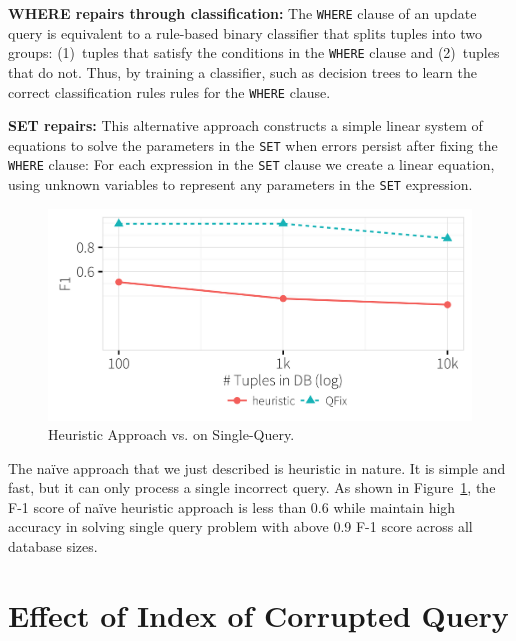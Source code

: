 \noindent
\textbf{WHERE repairs through classification:}
The \texttt{WHERE} clause of an update query is equivalent to a
rule-based binary classifier that splits tuples into two groups:
(1)~tuples that satisfy the conditions in the \texttt{WHERE} clause
and (2)~tuples that do not. Thus, by training a classifier,
such as decision trees \cite{quinlan1987} to learn
the correct classification rules rules for the \texttt{WHERE} clause.

\noindent
\textbf{SET repairs:}
This alternative approach constructs 
a simple linear system of equations to solve the parameters in the \texttt{SET}
when errors persist after fixing the \texttt{WHERE} clause:
For each expression in the \texttt{SET} clause we create a
linear equation, using unknown variables to represent any parameters
in the \texttt{SET} expression. 
  \begin{figure}[h]
  \centering
    \includegraphics[width = .6\columnwidth]{figures/heuristicacc}
    \vspace*{-.1in}
    \caption{Heuristic Approach vs. \sys on Single-Query. }
    \label{f:heuristic_acc} 
  \end{figure}
  \vspace*{-0.1in}
  
The na\"ive approach that we just described is heuristic in nature. It
is simple and fast, but it can only process a single incorrect query. As shown in
Figure~\ref{f:heuristic_acc}, the F-1 score of na\"ive heuristic approach is less 
than 0.6 while \sys maintain high accuracy in solving single query problem with
above 0.9 F-1 score across all database sizes. 
\fi
  
\section{Effect of Index of Corrupted Query}
\label{app:qidx}

